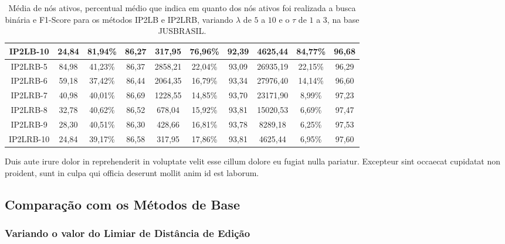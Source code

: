 \begin{table}[ht]
{\begin{tabular}{c|c|c|c|c|c|c|c|c|c|}
\multicolumn{1}{|c|}{IP2LB-10}  & 24,84   & 81,94\%   & 86,27   & 317,95    & 76,96\%  & 92,39  & 4625,44   & 84,77\%  & 96,68  \\ \hline
\multicolumn{1}{|c|}{IP2LRB-5}  & 84,98   & 41,23\%   & 86,37   & 2858,21   & 22,04\%  & 93,09  & 26935,19  & 22,15\%  & 96,29  \\ \hline
\multicolumn{1}{|c|}{IP2LRB-6}  & 59,18   & 37,42\%   & 86,44   & 2064,35   & 16,79\%  & 93,34  & 27976,40  & 14,14\%  & 96,60  \\ \hline
\multicolumn{1}{|c|}{IP2LRB-7}  & 40,98   & 40,01\%   & 86,69   & 1228,55   & 14,85\%  & 93,70  & 23171,90  & 8,99\%   & 97,23  \\ \hline
\multicolumn{1}{|c|}{IP2LRB-8}  & 32,78   & 40,62\%   & 86,52   & 678,04    & 15,92\%  & 93,81  & 15020,53  & 6,69\%   & 97,47  \\ \hline
\multicolumn{1}{|c|}{IP2LRB-9}  & 28,30   & 40,51\%   & 86,30   & 428,66    & 16,81\%  & 93,78  & 8289,18   & 6,25\%   & 97,53  \\ \hline
\multicolumn{1}{|c|}{IP2LRB-10} & 24,84   & 39,17\%   & 86,58   & 317,95    & 17,86\%  & 93,81  & 4625,44   & 6,95\%   & 97,60  \\ \hline
\end{tabular}%
}
\caption{Média de nós ativos, percentual médio que indica em quanto dos nós ativos foi realizada a busca binária e F1-Score para os métodos IP2LB e IP2LRB, variando $\lambda$ de $5$ a $10$ e o $\tau$ de $1$ a $3$, na base JUSBRASIL.}
\label{tab:binary-search-activation}
\end{table}

Duis aute irure dolor in reprehenderit in voluptate velit esse cillum dolore eu fugiat nulla pariatur. Excepteur sint occaecat cupidatat non proident, sunt in culpa qui officia deserunt mollit anim id est laborum.



\subsection{Comparação com os Métodos de Base}
\subsubsection{Variando o valor do Limiar de Distância de Edição}


